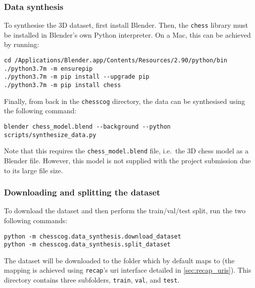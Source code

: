 \documentclass[../../report.tex]{subfiles}
\begin{document}
\subsubsection{Data synthesis}
To synthesise the 3D dataset, first install Blender. 
Then, the \texttt{chess} library must be installed in Blender's own Python interpreter.
On a Mac, this can be achieved by running:
\begin{verbatim}
cd /Applications/Blender.app/Contents/Resources/2.90/python/bin
./python3.7m -m ensurepip
./python3.7m -m pip install --upgrade pip
./python3.7m -m pip install chess
\end{verbatim}

Finally, from back in the \texttt{chesscog} directory, the data can be synthesised using the following command:
\begin{verbatim}
blender chess_model.blend --background --python scripts/synthesize_data.py
\end{verbatim}
Note that this requires the \texttt{chess\_model.blend} file, i.e.\ the 3D chess model as a Blender file.
However, this model is not supplied with the project submission due to its large file size.

\subsubsection{Downloading and splitting the dataset}
\label{sec:user_man_chesscog_download_dataset}
To download the dataset and then perform the train/val/test split, run the two following commands:
\begin{verbatim}
python -m chesscog.data_synthesis.download_dataset
python -m chesscog.data_synthesis.split_dataset
\end{verbatim}
The dataset will be downloaded to the  folder which by default maps to  (the mapping is achieved using \texttt{recap}'s \acs{uri} interface detailed in \cref{sec:recap_uris}).
This directory contains three subfolders, \texttt{train}, \texttt{val}, and \texttt{test}.
\end{document}
